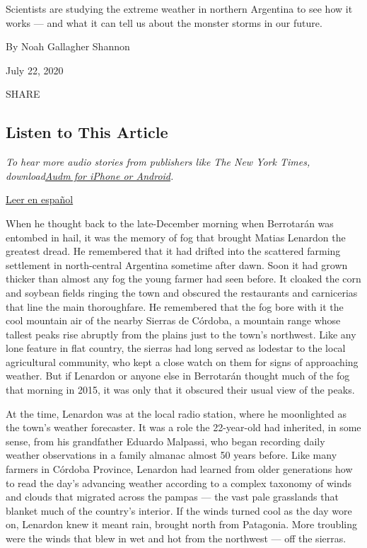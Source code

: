 Scientists are studying the extreme weather in northern Argentina to see
how it works --- and what it can tell us about the monster storms in our
future.

By Noah Gallagher Shannon

July 22, 2020

SHARE

\hypertarget{listen-to-this-article}{%
\subsection{Listen to This Article}\label{listen-to-this-article}}

\emph{To hear more audio stories from publishers like The New York
Times,
download\href{https://www.audm.com/?utm_source=nytmag\&utm_medium=embed\&utm_campaign=left_behind_draper}{}\href{https://www.audm.com/?utm_source=nytmag\&utm_medium=embed\&utm_campaign=relampago_thunderstorms_argentina}{Audm
for iPhone or Android}.}

\href{https://www.nytimes.com/es/interactive/2020/07/23/espanol/ciencia-y-tecnologia/cordoba-tormentas-argentina.html}{Leer
en español}

When he thought back to the late-December morning when Berrotarán was
entombed in hail, it was the memory of fog that brought Matias Lenardon
the greatest dread. He remembered that it had drifted into the scattered
farming settlement in north-central Argentina sometime after dawn. Soon
it had grown thicker than almost any fog the young farmer had seen
before. It cloaked the corn and soybean fields ringing the town and
obscured the restaurants and carnicerias that line the main
thoroughfare. He remembered that the fog bore with it the cool mountain
air of the nearby Sierras de Córdoba, a mountain range whose tallest
peaks rise abruptly from the plains just to the town's northwest. Like
any lone feature in flat country, the sierras had long served as
lodestar to the local agricultural community, who kept a close watch on
them for signs of approaching weather. But if Lenardon or anyone else in
Berrotarán thought much of the fog that morning in 2015, it was only
that it obscured their usual view of the peaks.

At the time, Lenardon was at the local radio station, where he
moonlighted as the town's weather forecaster. It was a role the
22-year-old had inherited, in some sense, from his grandfather Eduardo
Malpassi, who began recording daily weather observations in a family
almanac almost 50 years before. Like many farmers in Córdoba Province,
Lenardon had learned from older generations how to read the day's
advancing weather according to a complex taxonomy of winds and clouds
that migrated across the pampas --- the vast pale grasslands that
blanket much of the country's interior. If the winds turned cool as the
day wore on, Lenardon knew it meant rain, brought north from Patagonia.
More troubling were the winds that blew in wet and hot from the
northwest --- off the sierras.


